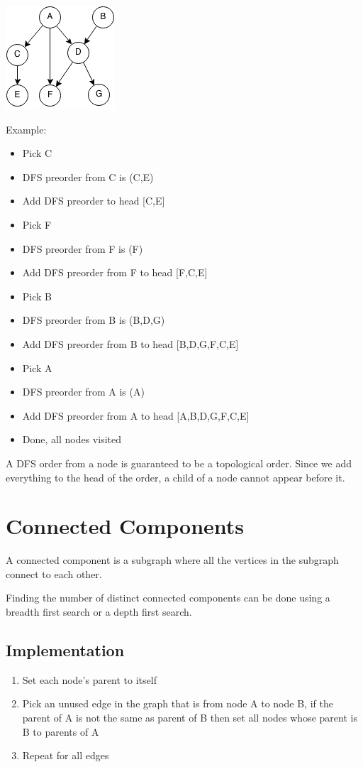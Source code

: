 \documentclass[11pt,oneside]{book}
\makeatletter
\def\maxwidth#1{\ifdim\Gin@nat@width>#1 #1\else\Gin@nat@width\fi}
\makeatother
\begin{document}
\includegraphics[width=\maxwidth{\textwidth}]{topsort.png}

Example:

\begin{itemize}
\item Pick C
\item DFS preorder from C is (C,E)
\item Add DFS preorder to head [C,E]
\item Pick F
\item DFS preorder from F is (F)
\item Add DFS preorder from F to head [F,C,E]
\item Pick B
\item DFS preorder from B is (B,D,G)
\item Add DFS preorder from B to head [B,D,G,F,C,E]
\item Pick A
\item DFS preorder from A is (A)
\item Add DFS preorder from A to head [A,B,D,G,F,C,E]
\item Done, all nodes visited
\end{itemize}

A DFS order from a node is guaranteed to be a topological order. Since we add everything to the head of the order, a child of a node cannot appear before it.
\section{Connected Components}

A connected component is a subgraph where all the vertices in the subgraph connect to each other.

Finding the number of distinct connected components can be done using a breadth first search or a depth first search.

\subsection{Implementation}

\begin{enumerate}
\item Set each node's parent to itself
\item Pick an unused edge in the graph that is from node A to node B, if the parent of A is not the same as parent of B then set all nodes whose parent is B to parents of A
\item Repeat for all edges
\end{enumerate}
\end{document}
